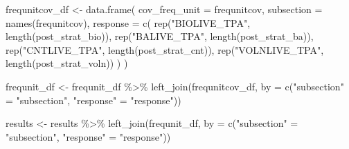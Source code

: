 \documentclass[12pt,twoside]{reedthesis}
\newenvironment{Shaded}{\begin{snugshade}}{\end{snugshade}}
\newcommand{\AttributeTok}[1]{\textcolor[rgb]{0.77,0.63,0.00}{#1}}
\newcommand{\FunctionTok}[1]{\textcolor[rgb]{0.00,0.00,0.00}{#1}}
\newcommand{\NormalTok}[1]{#1}
\newcommand{\OtherTok}[1]{\textcolor[rgb]{0.56,0.35,0.01}{#1}}
\newcommand{\SpecialCharTok}[1]{\textcolor[rgb]{0.00,0.00,0.00}{#1}}
\newcommand{\StringTok}[1]{\textcolor[rgb]{0.31,0.60,0.02}{#1}}
\begin{document}
\begin{Shaded}
\begin{Highlighting}[]
\NormalTok{frequnitcov\_df }\OtherTok{\textless{}{-}} \FunctionTok{data.frame}\NormalTok{(}
  \AttributeTok{cov\_freq\_unit =}\NormalTok{ frequnitcov,}
  \AttributeTok{subsection =} \FunctionTok{names}\NormalTok{(frequnitcov),}
  \AttributeTok{response =} \FunctionTok{c}\NormalTok{(}
    \FunctionTok{rep}\NormalTok{(}\StringTok{"BIOLIVE\_TPA"}\NormalTok{, }\FunctionTok{length}\NormalTok{(post\_strat\_bio)),}
    \FunctionTok{rep}\NormalTok{(}\StringTok{"BALIVE\_TPA"}\NormalTok{, }\FunctionTok{length}\NormalTok{(post\_strat\_ba)),}
    \FunctionTok{rep}\NormalTok{(}\StringTok{"CNTLIVE\_TPA"}\NormalTok{, }\FunctionTok{length}\NormalTok{(post\_strat\_cnt)),}
    \FunctionTok{rep}\NormalTok{(}\StringTok{"VOLNLIVE\_TPA"}\NormalTok{, }\FunctionTok{length}\NormalTok{(post\_strat\_voln))}
\NormalTok{  )}
\NormalTok{)}

\NormalTok{frequnit\_df }\OtherTok{\textless{}{-}}\NormalTok{ frequnit\_df }\SpecialCharTok{\%\textgreater{}\%}
  \FunctionTok{left\_join}\NormalTok{(frequnitcov\_df,}
            \AttributeTok{by =} \FunctionTok{c}\NormalTok{(}\StringTok{"subsection"} \OtherTok{=} \StringTok{"subsection"}\NormalTok{,}
                   \StringTok{"response"} \OtherTok{=} \StringTok{"response"}\NormalTok{))}

\NormalTok{results }\OtherTok{\textless{}{-}}\NormalTok{ results }\SpecialCharTok{\%\textgreater{}\%}
  \FunctionTok{left\_join}\NormalTok{(frequnit\_df,}
            \AttributeTok{by =} \FunctionTok{c}\NormalTok{(}\StringTok{"subsection"} \OtherTok{=} \StringTok{"subsection"}\NormalTok{,}
                   \StringTok{"response"} \OtherTok{=} \StringTok{"response"}\NormalTok{))}
\end{Highlighting}
\end{Shaded}
\end{document}
